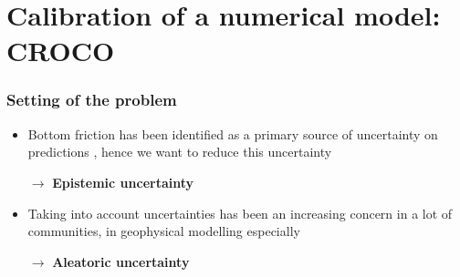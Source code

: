 \documentclass[11pt]{beamer}
\begin{document}

\section{Calibration of a numerical model: CROCO}

\begin{frame}
  \frametitle{Setting of the problem}
  \begin{itemize}
  \item Bottom friction has been identified as a primary source of uncertainty on predictions \cite{kreitmair_effect_2019}, hence we want to reduce this uncertainty

    $\rightarrow$ \textbf{Epistemic uncertainty} \cite{das_estimation_1991, das_variational_1992,boutet_estimation_2015}
  \item Taking into account uncertainties has been an increasing concern in a lot of communities, in geophysical modelling especially~\cite{palmer_representing_2005}

    $\rightarrow$ \textbf{Aleatoric uncertainty}
  \end{itemize}

\end{frame}
\end{document}
